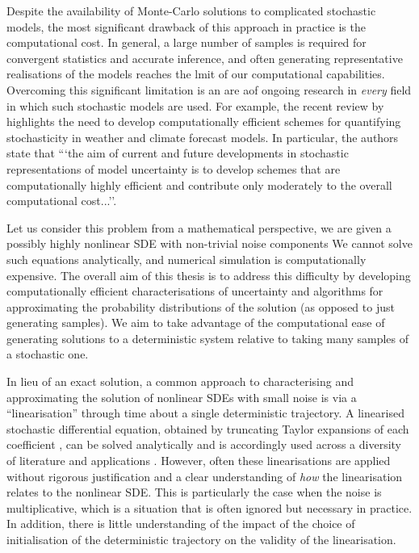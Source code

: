 Despite the availability of Monte-Carlo solutions to complicated stochastic models, the most significant drawback of this approach in practice is the computational cost.
In general, a large number of samples is required for convergent statistics and accurate inference, and often generating representative realisations of the models reaches the lmit of our computational capabilities.
Overcoming this significant limitation is an are aof ongoing research in \emph{every} field in which such stochastic models are used.
For example, the recent review by \citet{LeutbecherEtAl_2017_StochasticRepresentationsModel} highlights the need to develop computationally efficient schemes for quantifying stochasticity in weather and climate forecast models.
In particular, the authors state that ```the aim of current and future developments in stochastic representations of model uncertainty is to develop schemes that are computationally highly efficient and contribute only moderately to the overall computational cost...''.

Let us consider this problem from a mathematical perspective, we are given a possibly highly nonlinear SDE with non-trivial noise components
We cannot solve such equations analytically, and numerical simulation is computationally expensive.
The overall aim of this thesis is to address this difficulty by developing computationally efficient characterisations of uncertainty and algorithms for approximating the probability distributions of the solution (as opposed to just generating samples).
We aim to take advantage of the computational ease of generating solutions to a deterministic system relative to taking many samples of a stochastic one.

In lieu of an exact solution, a common approach to characterising and approximating the solution of nonlinear SDEs with small noise is via a ``linearisation'' through time about a single deterministic trajectory.
A linearised stochastic differential equation, obtained by truncating Taylor expansions of each coefficient \citep[e.g.]{Jazwinski_2014_StochasticProcessesFiltering,Blagoveshchenskii_1962_DiffusionProcessesDepending}, can be solved analytically and is accordingly used across a diversity of literature and applications \citep{Jazwinski_2014_StochasticProcessesFiltering,SarkkaSolin_2019_AppliedStochasticDifferential,KaszasHaller_2020_UniversalUpperEstimate,ArchambeauEtAl_2007_GaussianProcessApproximations,Sanz-AlonsoStuart_2017_GaussianApproximationsSmall,LawEtAl_2015_DataAssimilationMathematical,ReichCotter_2015_ProbabilisticForecastingBayesian,BudhirajaEtAl_2019_AssimilatingDataModels}.
However, often these linearisations are applied without rigorous justification and a clear understanding of \emph{how} the linearisation relates to the nonlinear SDE.
This is particularly the case when the noise is multiplicative, which is a situation that is often ignored but necessary in practice.
In addition, there is little understanding of the impact of the choice of initialisation of the deterministic trajectory on the validity of the linearisation.



